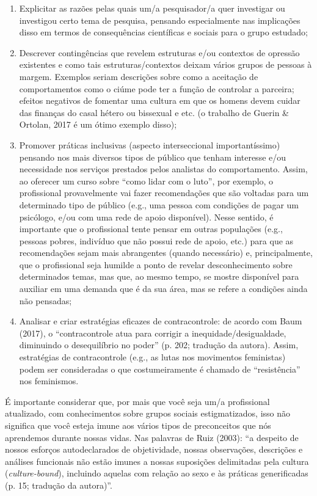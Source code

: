 \begin{enumerate}
    \item Explicitar as razões pelas quais um/a pesquisador/a quer investigar ou investigou certo tema de pesquisa, pensando especialmente nas implicações disso em termos de consequências científicas e sociais para o grupo estudado;
    \item Descrever contingências que revelem estruturas e/ou contextos de opressão existentes e como tais estruturas/contextos deixam vários grupos de pessoas à margem. Exemplos seriam descrições sobre como a aceitação de comportamentos como o ciúme pode ter a função de controlar a parceira; efeitos negativos de fomentar uma cultura em que os homens devem cuidar das finanças do casal hétero ou bissexual e etc. (o trabalho de Guerin \& Ortolan, 2017 é um ótimo exemplo disso);
    \item Promover práticas inclusivas (aspecto interseccional importantíssimo) pensando nos mais diversos tipos de público que tenham interesse e/ou necessidade nos serviços prestados pelos analistas do comportamento. Assim, ao oferecer um curso sobre ``como lidar com o luto'', por exemplo, o profissional provavelmente vai fazer recomendações que são voltadas para um determinado tipo de público (e.g., uma pessoa com condições de pagar um psicólogo, e/ou com uma rede de apoio disponível). Nesse sentido, é importante que o profissional tente pensar em outras populações (e.g., pessoas pobres, indivíduo que não possui rede de apoio, etc.) para que as recomendações sejam mais abrangentes (quando necessário) e, principalmente, que o profissional seja humilde a ponto de revelar desconhecimento sobre determinados temas, mas que, ao mesmo tempo, se mostre disponível para auxiliar em uma demanda que é da sua área, mas se refere a condições ainda não pensadas;
    \item Analisar e criar estratégias eficazes de contracontrole: de acordo com Baum (2017), o ``contracontrole atua para corrigir a inequidade/desigualdade, diminuindo o desequilíbrio no poder'' (p. 202; tradução da autora). Assim, estratégias de contracontrole (e.g., as lutas nos movimentos feministas) podem ser consideradas o que costumeiramente é chamado de ``resistência'' nos feminismos.
\end{enumerate}

É importante considerar que, por mais que você seja um/a profissional atualizado, com conhecimentos sobre grupos sociais estigmatizados, isso não significa que você esteja imune aos vários tipos de preconceitos que nós aprendemos durante nossas vidas. Nas palavras de Ruiz (2003): ``a despeito de nossos esforços autodeclarados de objetividade, nossas observações, descrições e análises funcionais não estão imunes a nossas suposições delimitadas pela cultura (\textit{culture-bound}), incluindo aquelas com relação ao sexo e às práticas generificadas (p. 15; tradução da autora)''.

